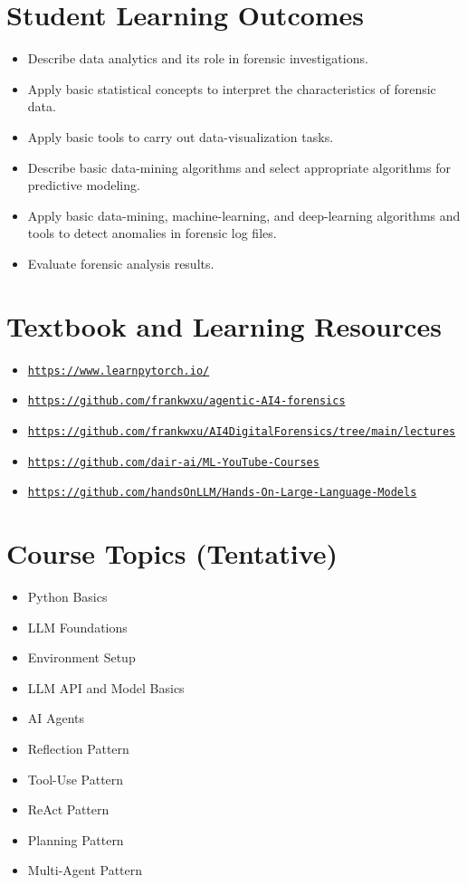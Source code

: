 \documentclass[10pt]{article}
\begin{document}
\section{Student Learning Outcomes}
\begin{itemize}
  \item Describe data analytics and its role in forensic investigations.
  \item Apply basic statistical concepts to interpret the characteristics of forensic data.
  \item Apply basic tools to carry out data-visualization tasks.
  \item Describe basic data-mining algorithms and select appropriate algorithms for predictive modeling.
  \item Apply basic data-mining, machine-learning, and deep-learning algorithms and tools to detect anomalies in forensic log files.
  \item Evaluate forensic analysis results.
\end{itemize}

\section{Textbook and Learning Resources}
\begin{itemize}
  \item \href{https://www.learnpytorch.io/}{\nolinkurl{https://www.learnpytorch.io/}}
  \item \href{https://github.com/frankwxu/agentic-AI4-forensics}{\nolinkurl{https://github.com/frankwxu/agentic-AI4-forensics}}
  \item \href{https://github.com/frankwxu/AI4DigitalForensics/tree/main/lectures}{\nolinkurl{https://github.com/frankwxu/AI4DigitalForensics/tree/main/lectures}}
  \item \href{https://github.com/dair-ai/ML-YouTube-Courses}{\nolinkurl{https://github.com/dair-ai/ML-YouTube-Courses}}
  \item \href{https://github.com/handsOnLLM/Hands-On-Large-Language-Models}{\nolinkurl{https://github.com/handsOnLLM/Hands-On-Large-Language-Models}}
\end{itemize}

\section{Course Topics (Tentative)}
\begin{itemize}
  \item Python Basics
  \item LLM Foundations
  \item Environment Setup
  \item LLM API and Model Basics
  \item AI Agents
  \item Reflection Pattern
  \item Tool-Use Pattern
  \item ReAct Pattern
  \item Planning Pattern
  \item Multi-Agent Pattern
\end{itemize}
\end{document}

